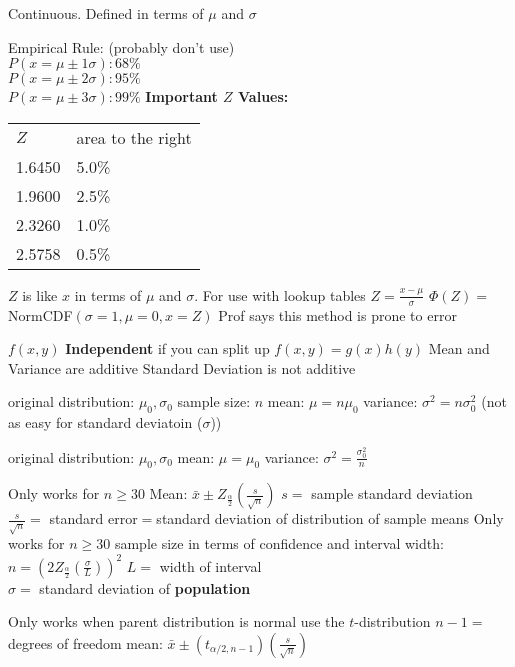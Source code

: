 \documentclass{article}
\begin{document}
\begin{multicols*}{2}
\begin{outline}[compactitem]
  \1 Continuous. Defined in terms of $\mu$ and $\sigma$

  \1 Empirical Rule: (probably don't use)
  \\ $P(x = \mu \pm 1\sigma): 68\%$
  \\ $P(x = \mu \pm 2\sigma): 95\%$
  \\ $P(x = \mu \pm 3\sigma): 99\%$
  \1 \textbf{Important $Z$ Values:}
  \\ \begin{tabular}{l l}
      $Z$    & area to the right \\
      1.6450 & 5.0\% \\
      1.9600 & 2.5\% \\
      2.3260 & 1.0\% \\
      2.5758 & 0.5\% \\
    \end{tabular}
  \1 $Z$ is like $x$ in terms of $\mu$ and $\sigma$.
  \1 For use with lookup tables
  \1 $Z = \frac{x-\mu}{\sigma}$
  \1 $\Phi(Z) = $NormCDF$(\sigma=1,\mu=0,x=Z)$
  \1 Prof says this method is prone to error

  \1 $f(x,y)$
  \1 \textbf{Independent} if you can split up $f(x,y)=g(x)h(y)$
  \1 Mean and Variance are additive
  \1 Standard Deviation is not additive



  \1 original distribution: $\mu_0, \sigma_0$
  \1 sample size: $n$
  \1 mean: $\mu = n\mu_0$
  \1 variance: $\sigma^2 = n\sigma^2_0$
  \1 (not as easy for standard deviatoin ($\sigma$))

  \1 original distribution: $\mu_0, \sigma_0$
  \1 mean: $\mu = \mu_0$
  \1 variance: $\sigma^2 = \frac{\sigma_0^2}{n}$



  \1 Only works for $n\geq30$
  \1 Mean: $\bar{x} \pm Z_{\frac{\alpha}{2}}\left(\frac{s}{\sqrt{n}}\right)$
    \2 $s=$ sample standard deviation
    \2 $\frac{s}{\sqrt{n}}=$ standard error$=$standard deviation of distribution of sample means
    \2 Only works for $n\geq30$
  \1 sample size in terms of confidence and interval width: $n = \left(2Z_\frac{\alpha}{2}\left(\frac{\sigma}{L}\right)\right)^2$
    \2 $L=$ width of interval
      \\ $\sigma=$ standard deviation of \textbf{population}

  \1 Only works when parent distribution is normal
  \1 use the $t$-distribution
  \1 $n-1=$ degrees of freedom
  \1 mean: $\bar{x} \pm \left(t_{\alpha/2, n-1}\right)\left(\frac{s}{\sqrt{n}}\right)$


\end{outline}
\end{multicols*}
\end{document}
